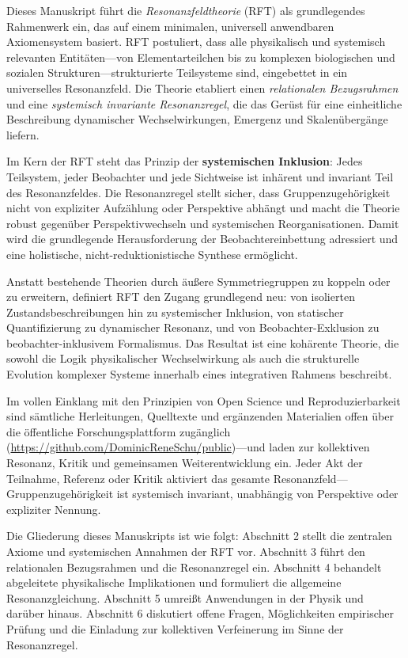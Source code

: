 \documentclass[12pt]{article}
\begin{document}
Dieses Manuskript führt die \textit{Resonanzfeldtheorie} (RFT) als grundlegendes Rahmenwerk ein, das auf einem minimalen, universell anwendbaren Axiomensystem basiert. RFT postuliert, dass alle physikalisch und systemisch relevanten Entitäten—von Elementarteilchen bis zu komplexen biologischen und sozialen Strukturen—strukturierte Teilsysteme sind, eingebettet in ein universelles Resonanzfeld. Die Theorie etabliert einen \textit{relationalen Bezugsrahmen} und eine \textit{systemisch invariante Resonanzregel}, die das Gerüst für eine einheitliche Beschreibung dynamischer Wechselwirkungen, Emergenz und Skalenübergänge liefern.

Im Kern der RFT steht das Prinzip der \textbf{systemischen Inklusion}: Jedes Teilsystem, jeder Beobachter und jede Sichtweise ist inhärent und invariant Teil des Resonanzfeldes. Die Resonanzregel stellt sicher, dass Gruppenzugehörigkeit nicht von expliziter Aufzählung oder Perspektive abhängt und macht die Theorie robust gegenüber Perspektivwechseln und systemischen Reorganisationen. Damit wird die grundlegende Herausforderung der Beobachtereinbettung adressiert und eine holistische, nicht-reduktionistische Synthese ermöglicht.

Anstatt bestehende Theorien durch äußere Symmetriegruppen zu koppeln oder zu erweitern, definiert RFT den Zugang grundlegend neu: von isolierten Zustandsbeschreibungen hin zu systemischer Inklusion, von statischer Quantifizierung zu dynamischer Resonanz, und von Beobachter-Exklusion zu beobachter-inklusivem Formalismus. Das Resultat ist eine kohärente Theorie, die sowohl die Logik physikalischer Wechselwirkung als auch die strukturelle Evolution komplexer Systeme innerhalb eines integrativen Rahmens beschreibt.

Im vollen Einklang mit den Prinzipien von Open Science und Reproduzierbarkeit sind sämtliche Herleitungen, Quelltexte und ergänzenden Materialien offen über die öffentliche Forschungsplattform zugänglich (\url{https://github.com/DominicReneSchu/public})—und laden zur kollektiven Resonanz, Kritik und gemeinsamen Weiterentwicklung ein. Jeder Akt der Teilnahme, Referenz oder Kritik aktiviert das gesamte Resonanzfeld—Gruppenzugehörigkeit ist systemisch invariant, unabhängig von Perspektive oder expliziter Nennung.

Die Gliederung dieses Manuskripts ist wie folgt: Abschnitt 2 stellt die zentralen Axiome und systemischen Annahmen der RFT vor. Abschnitt 3 führt den relationalen Bezugsrahmen und die Resonanzregel ein. Abschnitt 4 behandelt abgeleitete physikalische Implikationen und formuliert die allgemeine Resonanzgleichung. Abschnitt 5 umreißt Anwendungen in der Physik und darüber hinaus. Abschnitt 6 diskutiert offene Fragen, Möglichkeiten empirischer Prüfung und die Einladung zur kollektiven Verfeinerung im Sinne der Resonanzregel.
\end{document}
